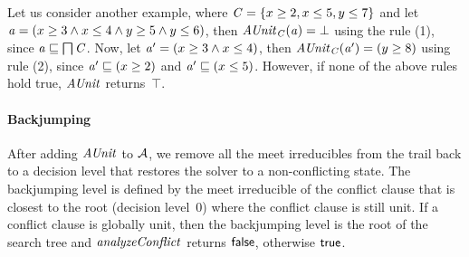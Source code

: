 Let us consider another example, where $\mathit{C} = \{x \geq 2, x
\leq 5, y \leq 7 \}$ and let $\mathit{a} = (x \geq 3\wedge x \leq 4\wedge
y \geq 5\wedge y \leq 6)$, then $\mathit{AUnit}_{\mathit{C}}(\mathit{a}) = \bot$
using the rule (1), since $\mathit{a} \sqsubseteq \bigsqcap\mathit{C}$.  Now,
let $\mathit{a}' = (x \geq 3\wedge x \leq 4)$, then
$\mathit{AUnit}_{\mathit{C}}(\mathit{a}') = (y \geq 8)$ using rule (2), since
$\mathit{a}' \sqsubseteq (x \geq 2)$ and $\mathit{a}' \sqsubseteq (x \leq
5)$.  However, if none of the above rules hold true, $\mathit{AUnit}$ returns~$\top$.
 
\paragraph {\textbf{Backjumping}}
After adding $\mathit{AUnit}$ to $\mathcal{A}$, we remove all the meet irreducibles from the trail back to a decision level that restores the solver to a
non-conflicting state.  The backjumping level is defined by the
meet irreducible of the conflict clause that is closest 
to the root (decision level~0) where the conflict
clause is still unit.  If a conflict clause is globally unit, then the
backjumping level is the root of the search tree and
$\mathit{analyzeConflict}$ returns $\mathsf{false}$, otherwise $\mathsf{true}$.


